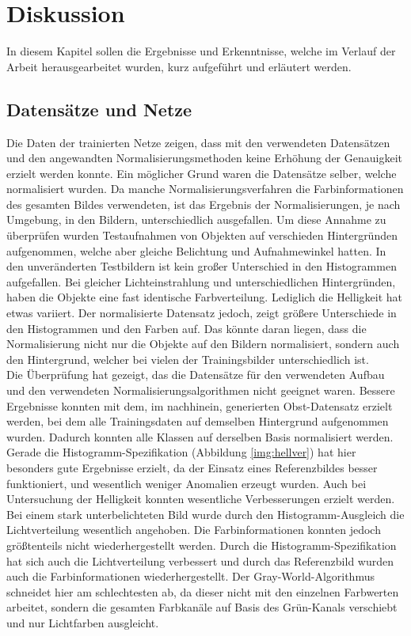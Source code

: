 \chapter{Diskussion}\label{s.diskussion}
In diesem Kapitel sollen die Ergebnisse und Erkenntnisse, welche im Verlauf der Arbeit herausgearbeitet wurden, kurz aufgeführt und erläutert werden.
\section{Datensätze und Netze}
Die Daten der trainierten Netze zeigen, dass mit den verwendeten Datensätzen und den angewandten Normalisierungsmethoden keine Erhöhung der Genauigkeit erzielt werden konnte. Ein möglicher Grund waren die Datensätze selber, welche normalisiert wurden. Da manche Normalisierungsverfahren die Farbinformationen des gesamten Bildes verwendeten, ist das Ergebnis der Normalisierungen, je nach Umgebung, in den Bildern, unterschiedlich ausgefallen. Um diese Annahme zu überprüfen wurden Testaufnahmen von Objekten auf verschieden Hintergründen aufgenommen, welche aber gleiche Belichtung und Aufnahmewinkel hatten. In den unveränderten Testbildern ist kein großer Unterschied in den Histogrammen aufgefallen. Bei gleicher Lichteinstrahlung und unterschiedlichen Hintergründen, haben die Objekte eine fast identische Farbverteilung. Lediglich die Helligkeit hat etwas variiert. Der normalisierte Datensatz jedoch, zeigt größere Unterschiede in den Histogrammen und den Farben auf. Das könnte daran liegen, dass die Normalisierung nicht nur die Objekte auf den Bildern normalisiert, sondern auch den Hintergrund, welcher bei vielen der Trainingsbilder unterschiedlich ist.\\ 
Die Überprüfung hat gezeigt, das die Datensätze für den verwendeten Aufbau und den verwendeten Normalisierungsalgorithmen nicht geeignet waren. Bessere Ergebnisse konnten mit dem, im nachhinein, generierten Obst-Datensatz erzielt werden, bei dem alle Trainingsdaten auf demselben Hintergrund aufgenommen wurden. Dadurch konnten alle Klassen auf derselben Basis normalisiert werden. Gerade die Histogramm-Spezifikation (Abbildung \ref{img:hellver}) hat hier besonders gute Ergebnisse erzielt, da der Einsatz eines Referenzbildes besser funktioniert, und wesentlich weniger Anomalien erzeugt wurden. Auch bei Untersuchung der Helligkeit konnten wesentliche Verbesserungen erzielt werden. Bei einem stark unterbelichteten Bild wurde durch den Histogramm-Ausgleich die Lichtverteilung wesentlich angehoben. Die Farbinformationen konnten jedoch größtenteils nicht wiederhergestellt werden. Durch die Histogramm-Spezifikation hat sich auch die Lichtverteilung verbessert und durch das Referenzbild wurden auch die Farbinformationen wiederhergestellt. Der Gray-World-Algorithmus schneidet hier am schlechtesten ab, da dieser nicht mit den einzelnen Farbwerten arbeitet, sondern die gesamten Farbkanäle auf Basis des Grün-Kanals verschiebt und nur Lichtfarben ausgleicht. 
